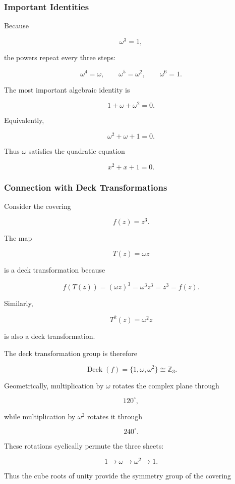 \documentclass[12pt,a4paper]{article}
\theoremstyle{notespace}
\begin{document}
\subsubsection{Important Identities}

Because

\[
\omega^3=1,
\]

the powers repeat every three steps:

\[
\omega^4=\omega,
\qquad
\omega^5=\omega^2,
\qquad
\omega^6=1.
\]

The most important algebraic identity is

\[
1+\omega+\omega^2=0.
\]

Equivalently,

\[
\omega^2+\omega+1=0.
\]

Thus \(\omega\) satisfies the quadratic equation

\[
x^2+x+1=0.
\]

\subsubsection{Connection with Deck Transformations}

Consider the covering

\[
f(z)=z^3.
\]

The map

\[
T(z)=\omega z
\]

is a deck transformation because

\[
f(T(z))
=
(\omega z)^3
=
\omega^3 z^3
=
z^3
=
f(z).
\]

Similarly,

\[
T^2(z)=\omega^2 z
\]

is also a deck transformation.

The deck transformation group is therefore

\[
\operatorname{Deck}(f)
=
\{1,\omega,\omega^2\}
\cong
\mathbb Z_3.
\]

Geometrically, multiplication by \(\omega\) rotates the complex plane through

\[
120^\circ,
\]

while multiplication by \(\omega^2\) rotates it through

\[
240^\circ.
\]

These rotations cyclically permute the three sheets:

\[
1
\longrightarrow
\omega
\longrightarrow
\omega^2
\longrightarrow
1.
\]

Thus the cube roots of unity provide the symmetry group of the covering
\end{document}
